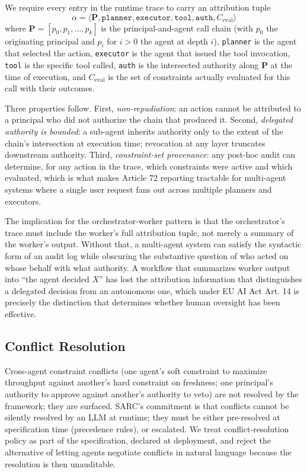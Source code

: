 \documentclass[11pt,a4paper]{article}
\theoremstyle{remark}
\begin{document}
We require every entry in the runtime trace to carry an attribution tuple
\[
    \alpha = \langle \mathbf{P}, \texttt{planner}, \texttt{executor}, \texttt{tool}, \texttt{auth}, C_{\text{eval}} \rangle
\]
where $\mathbf{P} = [p_0, p_1, \ldots, p_k]$ is the principal-and-agent call chain (with $p_0$ the originating principal and $p_i$ for $i > 0$ the agent at depth $i$), \texttt{planner} is the agent that selected the action, \texttt{executor} is the agent that issued the tool invocation, \texttt{tool} is the specific tool called, \texttt{auth} is the intersected authority along $\mathbf{P}$ at the time of execution, and $C_{\text{eval}}$ is the set of constraints actually evaluated for this call with their outcomes.

Three properties follow. First, \emph{non-repudiation}: an action cannot be attributed to a principal who did not authorize the chain that produced it. Second, \emph{delegated authority is bounded}: a sub-agent inherits authority only to the extent of the chain's intersection at execution time; revocation at any layer truncates downstream authority. Third, \emph{constraint-set provenance}: any post-hoc audit can determine, for any action in the trace, which constraints were active and which evaluated, which is what makes Article 72 reporting tractable for multi-agent systems where a single user request fans out across multiple planners and executors.

The implication for the orchestrator-worker pattern is that the orchestrator's trace must include the worker's full attribution tuple, not merely a summary of the worker's output. Without that, a multi-agent system can satisfy the syntactic form of an audit log while obscuring the substantive question of who acted on whose behalf with what authority. A workflow that summarizes worker output into ``the agent decided $X$'' has lost the attribution information that distinguishes a delegated decision from an autonomous one, which under EU AI Act Art. 14 is precisely the distinction that determines whether human oversight has been effective.

\subsection{Conflict Resolution}

Cross-agent constraint conflicts (one agent's soft constraint to maximize throughput against another's hard constraint on freshness; one principal's authority to approve against another's authority to veto) are not resolved by the framework; they are surfaced. SARC's commitment is that conflicts cannot be silently resolved by an LLM at runtime; they must be either pre-resolved at specification time (precedence rules), or escalated. We treat conflict-resolution policy as part of the specification, declared at deployment, and reject the alternative of letting agents negotiate conflicts in natural language because the resolution is then unauditable.
\end{document}
